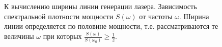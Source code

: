 \begin{figure}
\centering



\caption{К вычислению ширины линии генерации лазера. Зависимость
  спектральной плотности мощности $S\left(\omega\right)$ от частоты
  $\omega$. Ширина линии определяется по половине мощности, т.е.
  рассматриваются те величины $\omega$ при которых
  $\frac{S(\omega)}{S(\omega_0)} \ge \frac{1}{2}$.
}
\label{figPart2Ch1_8}
\end{figure}
